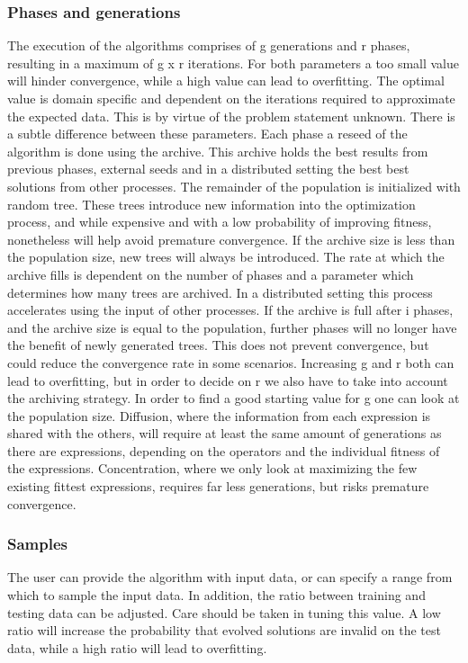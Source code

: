\subsubsection{Phases and generations}
The execution of the algorithms comprises of g generations and r phases, resulting in a maximum of g x r iterations. 
For both parameters a too small value will hinder convergence, while a high value can lead to overfitting. The optimal value is domain specific and dependent on the iterations required to approximate the expected data. This is by virtue of the problem statement unknown. There is a subtle difference between these parameters. 
Each phase a reseed of the algorithm is done using the archive. This archive holds the best results from previous phases, external seeds and in a distributed setting the best best solutions from other processes.
The remainder of the population is initialized with random tree. These trees introduce new information into the optimization process, and while expensive and with a low probability of improving fitness, nonetheless will help avoid premature convergence. 
If the archive size is less than the population size, new trees will always be introduced. The rate at which the archive fills is dependent on the number of phases and a parameter which determines how many trees are archived. In a distributed setting this process accelerates using the input of other processes. If the archive is full after i phases, and the archive size is equal to the population, further phases will no longer have the benefit of newly generated trees. This does not prevent convergence, but could reduce the convergence rate in some scenarios. Increasing g and r both can lead to overfitting, but in order to decide on r we also have to take into account the archiving strategy. In order to find a good starting value for g one can look at the population size. 
Diffusion, where the information from each expression is shared with the others, will require at least the same amount of generations as there are expressions, depending on the operators and the individual fitness of the expressions. Concentration, where we only look at maximizing the few existing fittest expressions, requires far less generations, but risks premature convergence.
\subsubsection{Samples}
The user can provide the algorithm with input data, or can specify a range from which to sample the input data. In addition, the ratio between training and testing data can be adjusted. Care should be taken in tuning this value. A low ratio will increase the probability that evolved solutions are invalid on the test data, while a high ratio will lead to overfitting.

